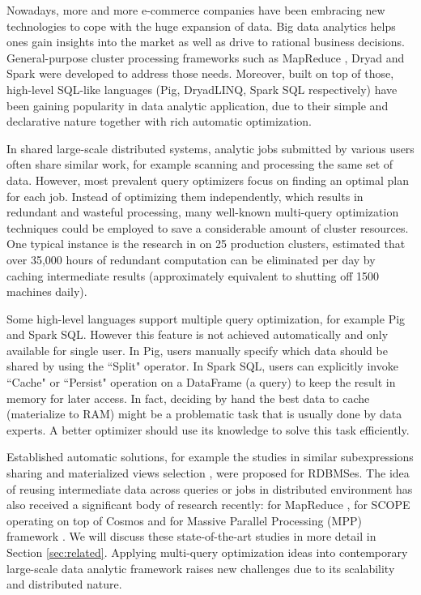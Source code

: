 Nowadays, more and more e-commerce companies have been embracing new technologies to cope with the huge expansion of data. Big data analytics helps ones gain insights into the market as well as drive to rational business decisions. General-purpose cluster processing frameworks such as MapReduce \cite{dean2008mapreduce}, Dryad \cite{isard2007dryad} and Spark \cite{zaharia2012resilient} were developed to address those needs. Moreover, built on top of those, high-level SQL-like languages (Pig, DryadLINQ, Spark SQL respectively) have been gaining popularity in data analytic application, due to their simple and declarative nature together with rich automatic optimization.

In shared large-scale distributed systems, analytic jobs submitted by various users often share similar work, for example scanning and processing the same set of data. However, most prevalent query optimizers focus on finding an optimal plan for each job. Instead of optimizing them independently, which results in redundant and wasteful processing, many well-known multi-query optimization techniques could be employed to save a considerable amount of cluster resources. One typical instance is the research in \cite{gunda2010nectar} on 25 production clusters, estimated that over 35,000 hours of redundant computation can be eliminated per day by caching intermediate results (approximately equivalent to shutting off 1500 machines daily).

Some high-level languages support multiple query optimization, for example Pig and Spark SQL. However this feature is not achieved automatically and only available for single user. In Pig, users manually specify which data should be shared by using the ``Split" operator. In Spark SQL, users can explicitly invoke ``Cache" or ``Persist" operation on a DataFrame (a query) to keep the result in memory for later access. In fact, deciding by hand the best data to cache (materialize to RAM) might be a problematic task that is usually done by data experts. A better optimizer should use its knowledge to solve this task efficiently.

Established automatic solutions, for example the studies in similar subexpressions sharing \cite{zhou2007efficient} and materialized views selection \cite{goldstein2001optimizing, mistry2001materialized}, were proposed for RDBMSes. The idea of reusing intermediate data across queries or jobs in distributed environment has also received a significant body of research  recently: for MapReduce \cite{mrshare, mqo}, for SCOPE operating on top of Cosmos \cite{silva2012exploiting} and for Massive Parallel Processing (MPP) framework \cite{el2015optimization}. We will discuss these state-of-the-art studies in more detail in Section \ref{sec:related}. Applying multi-query optimization ideas into contemporary large-scale data analytic framework raises new challenges due to its scalability and distributed nature.

